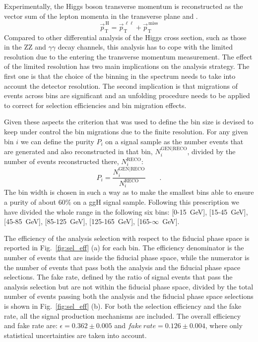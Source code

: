 Experimentally, the Higgs boson transverse momentum is reconstructed as the vector sum of the lepton momenta in the transverse plane and \MET.
\begin{equation}
\vec{p}_\mathrm{T}^\mathrm{\,H} = \vec{p}_\mathrm{T}^{\,\ell\ell} + \vec{p}_\mathrm{T}^\mathrm{\,miss}
\end{equation}
Compared to other differential analysis of the Higgs cross section, such as those in the ZZ and $\gamma\gamma$ decay channels, this analysis has to cope with the limited resolution due to the \MET entering the transverse momentum measurement.
The effect of the limited \MET resolution has two main implications on the analysis strategy.
The first one is that the choice of the binning in the \pth{} spectrum needs to take into account the detector resolution.
The second implication is that migrations of events across bins are significant and an unfolding procedure needs to be applied to correct for selection efficiencies and bin migration effects.

Given these aspects the criterion that was used to define the \pth bin size is devised to keep under control the bin migrations due to the finite resolution.
For any given bin $i$ we can define the purity $P_i$ on a signal sample as the number events that are generated and also reconstructed in that bin, $N_i^\mathrm{GEN|RECO}$, divided by the number of events reconstructed there, $N_i^\mathrm{RECO}$:
\begin{equation}
P_i = \frac{N_i^\mathrm{GEN|RECO}}{N_i^\mathrm{RECO}} \qquad .
\end{equation}
The bin width is chosen in such a way as to make the smallest bins able to ensure a purity of about 60\% on a ggH signal sample.
Following this prescription we have divided the whole \pth range in the following six bins: \mbox{[0-15 GeV]}, \mbox{[15-45 GeV]}, \mbox{[45-85 GeV]}, \mbox{[85-125 GeV]}, \mbox{[125-165 GeV]}, \mbox{[165-$\infty$ GeV]}.

The efficiency of the analysis selection with respect to the fiducial phase space is reported in Fig.~\ref{fig:sel_eff} (a) for each \pth bin. The efficiency denominator is the number of events that are inside the fiducial phase space, while the numerator is the number of events that pass both the analysis and the fiducial phase space selections. The fake rate, defined by the ratio of signal events that pass the analysis selection but are not within the fiducial phase space, divided by the total number of events passing both the analysis and the fiducial phase space selections is shown in Fig.~\ref{fig:sel_eff} (b). For both the selection efficiency and the fake rate, all the signal production mechanisms are included.
The overall efficiency and fake rate are: $\epsilon=0.362\pm{0.005}$ and $fake~rate=0.126\pm0.004$, where only statistical uncertainties are taken into account.

